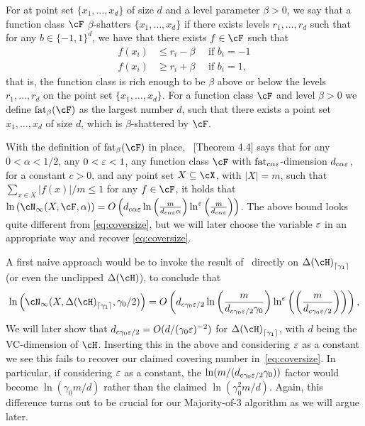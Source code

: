 For at point set $\{  x_{1},\ldots,x_d\} $ of size $ d $ and a level parameter $ \beta>0 $, we say that a function class $ \cF $ $ \beta $-shatters   $ \{  x_{1},\ldots,x_d\} $ if there exists levels $ r_1,\ldots,r_{d} $ such that for any $ b\in \{  -1,1\}^{d} $, we have that there exists $ f\in \cF $ such that 
    \begin{align*}
        f(x_i)&\leq r_{i}-\beta  \quad \text{ if  } b_{i}=-1
        \\
        f(x_i)&\geq r_{i}+\beta  \quad \text{ if  } b_{i}=1,
    \end{align*}
    that is, the function class is rich enough to be $ \beta $  above or below the levels $ r_{1},\ldots,r_{d} $ on the point set $ \{  x_{1},\ldots,x_d\}$.  
    For a function class $ \cF $ and level $ \beta>0 $  we define $ \fat_{\beta}(\cF) $  as the largest number $ d $,  such that there exists a point set $ x_{1},\ldots,x_{d}   $ of size $ d $, which is $ \beta $-shattered by $ \cF $.


    With the definition of $\fat_\beta(\cF)$ in place,~\cite{RudelsonVershynin}  [Theorem 4.4] says that for any $ 0<\alpha <1/2$, any $0 < \varepsilon < 1$, any function class $ \cF $ with $ \operatorname{\mathrm{fat}}_{c\alpha\varepsilon} $-dimension $ d_{c\alpha\varepsilon} $, for a constant $ c>0 $, and any point set $ X\subseteq \cX $, with $ |X|=m $, such that $ \sum_{x\in X}|f(x)|/m \leq 1$ for any $ f\in \cF $, it holds that $ \ln{\left(\cN_{\infty}(X,\cF,\alpha) \right)}=O\left(d_{c\alpha\eps}\ln{\left(\frac{m}{d_{c\alpha\eps}\alpha} \right)}\ln^{\eps}{\left(\frac{m}{d_{c\alpha\eps}} \right)}\right)$. 
    The above bound looks quite different from \cref{eq:coversize}, but we will later choose the variable $ \varepsilon $ in an appropriate way and recover \cref{eq:coversize}. 

A first naive approach would be to invoke the result of~\cite{RudelsonVershynin} directly on $\dlh_{\left\lceil\gamma_1 \right\rceil}$ (or even the unclipped $\dlh$), to conclude that
\begin{align}
\ln{\left(\cN_{\infty}(X,\dlh_{\left\lceil\gamma_1 \right\rceil},\gamma_0/2) \right)}=O\left(d_{c\gamma_0\eps/2}\ln\left(\frac{m}{d_{c\gamma_0\eps/2} \gamma_0} \right)\ln^{\eps}\left({\left(\frac{m}{d_{c\gamma_0\eps/2}} \right)}\right) \right), \label{eq:naivecover}
\end{align}
We will later show that $d_{c\gamma_0\varepsilon/2} = O(d/ (\gamma_0\varepsilon)^{-2})$ for $\dlh_{\left\lceil\gamma_1 \right\rceil}$, with $ d $ being the VC-dimension of $ \cH $. Inserting this in the above and considering $ \varepsilon $ as a constant we see this  fails to recover our claimed covering number in~\cref{eq:coversize}. In particular, if considering $ \varepsilon $ as a constant, the $\ln(m/(d_{c\gamma_0\varepsilon/2}  \gamma_0))$ factor would become $\ln(\gamma_0 m/d)$ rather than the claimed $\ln(\gamma_0^2 m/d)$. Again, this difference turns out to be crucial for our Majority-of-3 algorithm as we will argue later.

